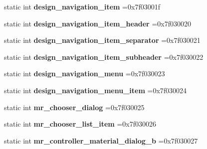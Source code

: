 \begin{DoxyCompactItemize}
static int {\bfseries design\+\_\+navigation\+\_\+item} =0x7f03001f
\item 
\mbox{\label{classandroid_1_1support_1_1v4_1_1R_1_1layout_ac4d5292ee533090bc40f766199ce2612}} 
static int {\bfseries design\+\_\+navigation\+\_\+item\+\_\+header} =0x7f030020
\item 
\mbox{\label{classandroid_1_1support_1_1v4_1_1R_1_1layout_a8c39c06d28df88741f38fe0f1139205f}} 
static int {\bfseries design\+\_\+navigation\+\_\+item\+\_\+separator} =0x7f030021
\item 
\mbox{\label{classandroid_1_1support_1_1v4_1_1R_1_1layout_ab9f9ec68230124746ae51e300eace5e6}} 
static int {\bfseries design\+\_\+navigation\+\_\+item\+\_\+subheader} =0x7f030022
\item 
\mbox{\label{classandroid_1_1support_1_1v4_1_1R_1_1layout_abfae9dcf9efcc518e7974f3f9e6800e2}} 
static int {\bfseries design\+\_\+navigation\+\_\+menu} =0x7f030023
\item 
\mbox{\label{classandroid_1_1support_1_1v4_1_1R_1_1layout_ae127c51a16738d27fe49f11e7c29a421}} 
static int {\bfseries design\+\_\+navigation\+\_\+menu\+\_\+item} =0x7f030024
\item 
\mbox{\label{classandroid_1_1support_1_1v4_1_1R_1_1layout_ae5cb320da7ac90ac2d3c203b72680ed1}} 
static int {\bfseries mr\+\_\+chooser\+\_\+dialog} =0x7f030025
\item 
\mbox{\label{classandroid_1_1support_1_1v4_1_1R_1_1layout_a64e7f8cb7c3b17c074b84442e1cafec1}} 
static int {\bfseries mr\+\_\+chooser\+\_\+list\+\_\+item} =0x7f030026
\item 
\mbox{\label{classandroid_1_1support_1_1v4_1_1R_1_1layout_aa51d6b024cbfe1a935d58d3d193a67d4}} 
static int {\bfseries mr\+\_\+controller\+\_\+material\+\_\+dialog\+\_\+b} =0x7f030027
\item 

\end{DoxyCompactItemize}
